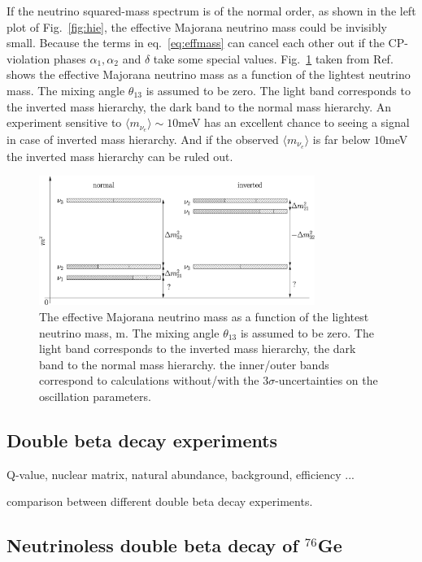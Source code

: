 If the neutrino squared-mass spectrum is of the normal order, as shown in the left plot of Fig.~\ref{fig:hie}, the effective Majorana neutrino mass could be invisibly small. Because the terms in eq.~\ref{eq:effmass} can cancel each other out if the CP-violation phases $\alpha_{1}, \alpha_{2}$ and $\delta$ take some special values. Fig.~\ref{fig:effmvmm} taken from Ref.~\cite{Mer06} shows the effective Majorana neutrino mass as a function of the lightest neutrino mass. The mixing angle $\theta_{13}$ is assumed to be zero. The light band corresponds to the inverted mass hierarchy, the dark band to the normal mass hierarchy. An experiment sensitive to $\langle m_{\nu_{e}} \rangle \sim 10$meV has an excellent chance to seeing a signal in case of inverted mass hierarchy. And if the observed $\langle m_{\nu_{e}} \rangle$ is far below $10$meV the inverted mass hierarchy can be ruled out.
\begin{figure}[tbhp]
  \centering
  \includegraphics[width=0.8\textwidth]{massHierarchy.eps}  
  \caption{The effective Majorana neutrino mass as a function of the lightest neutrino mass, m. The mixing angle $\theta_{13}$ is assumed to be zero. The light band corresponds to the inverted mass hierarchy, the dark band to the normal mass hierarchy. the inner/outer bands correspond to calculations without/with the $3\sigma$-uncertainties on the oscillation parameters. }
  \label{fig:effmvmm}
\end{figure}

\subsection{Double beta decay experiments}
\label{sec:genremark}
Q-value, nuclear matrix, natural abundance, background, efficiency ...

comparison between different double beta decay experiments.

\subsection{Neutrinoless double beta decay of $^{76}$Ge}
\label{sec:ge76}

